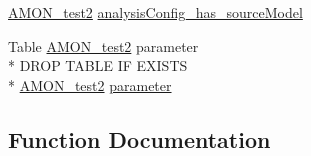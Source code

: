 \begin{DoxyCompactItemize}
\hyperlink{db__mc__build_8sql_a19c21c59303d8b6591b92240ff7de1d5}{A\-M\-O\-N\-\_\-test2} \hyperlink{db__mc__build_8sql_a86a1d4103054b5def2a754b42156e90f}{analysis\-Config\-\_\-has\-\_\-source\-Model}
\item 
Table \hyperlink{db__mc__build_8sql_a19c21c59303d8b6591b92240ff7de1d5}{A\-M\-O\-N\-\_\-test2} parameter \\*
D\-R\-O\-P T\-A\-B\-L\-E I\-F E\-X\-I\-S\-T\-S \\*
\hyperlink{db__mc__build_8sql_a19c21c59303d8b6591b92240ff7de1d5}{A\-M\-O\-N\-\_\-test2} \hyperlink{db__mc__build_8sql_ae160d9514a53a2b7c888f4b9e50004f3}{parameter}
\end{DoxyCompactItemize}


\subsection{Function Documentation}
